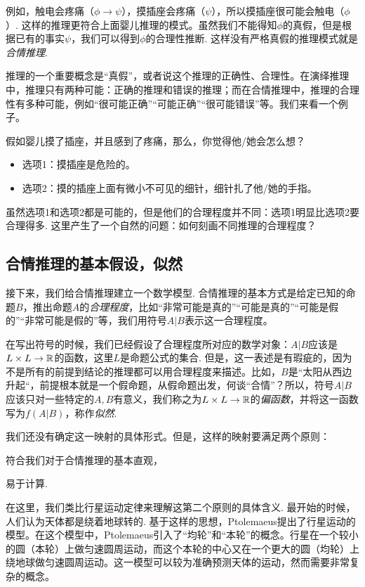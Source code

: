 例如，触电会疼痛（$\phi\to \psi$），摸插座会疼痛（$\psi$），所以摸插座很可能会触电（$\phi$）.  这样的推理更符合上面婴儿推理的模式。虽然我们不能得知$\phi$的真假，但是根据已有的事实$\psi$，我们可以得到$\phi$的合理性推断. 这样没有严格真假的推理模式就是\emph{合情推理}.

推理的一个重要概念是“真假”，或者说这个推理的正确性、合理性。在演绎推理中，推理只有两种可能：正确的推理和错误的推理；而在合情推理中，推理的合理性有多种可能，例如“很可能正确”“可能正确”“很可能错误”等。我们来看一个例子。

\begin{example}
    假如婴儿摸了插座，并且感到了疼痛，那么，你觉得他/她会怎么想？
    \begin{itemize}
        \item 选项1：摸插座是危险的。
        \item 选项2：摸的插座上面有微小不可见的细针，细针扎了他/她的手指。
    \end{itemize}
\end{example}
虽然选项1和选项2都是可能的，但是他们的合理程度并不同：选项1明显比选项2要合理得多. 这里产生了一个自然的问题：如何刻画不同推理的合理程度？

\subsection{合情推理的基本假设，似然}

接下来，我们给合情推理建立一个数学模型. 合情推理的基本方式是给定已知的命题$B$，推出命题$A$的\emph{合理程度}，比如“非常可能是真的”“可能是真的”“可能是假的”“非常可能是假的”等，我们用符号$A|B$表示这一合理程度。

在写出符号的时候，我们已经假设了合理程度所对应的数学对象：$A|B$应该是$L\times L\to\mathbb{R}$的函数，这里$L$是命题公式的集合. 但是，这一表述是有瑕疵的，因为不是所有的前提到结论的推理都可以用合理程度来描述。比如，$B$是“太阳从西边升起“，前提根本就是一个假命题，从假命题出发，何谈“合情”？所以，符号$A|B$应该只对一些特定的$A,B$有意义，我们称之为$L\times L\to\mathbb{R}$的\emph{偏函数}，并将这一函数写为$f(A|B)$，称作\emph{似然}.

我们还没有确定这一映射的具体形式。但是，这样的映射要满足两个原则：
\begin{enumerate*}
    \item 符合我们对于合情推理的基本直观，
    \item 易于计算.
\end{enumerate*}

在这里，我们类比行星运动定律来理解这第二个原则的具体含义. 最开始的时候，人们认为天体都是绕着地球转的. 基于这样的思想，Ptolemaeus提出了行星运动的模型。在这个模型中，Ptolemaeus引入了“均轮”和“本轮”的概念。行星在一个较小的圆（本轮）上做匀速圆周运动，而这个本轮的中心又在一个更大的圆（均轮）上绕地球做匀速圆周运动。这一模型可以较为准确预测天体的运动，然而需要非常复杂的概念。

